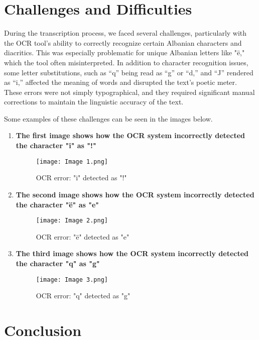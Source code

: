 \documentclass[12pt]{article}
\begin{document}
\section*{Challenges and Difficulties}
During the transcription process, we faced several challenges, particularly with the OCR tool’s ability to correctly recognize certain Albanian characters and diacritics. This was especially problematic for unique Albanian letters like "ë," which the tool often misinterpreted. In addition to character recognition issues, some letter substitutions, such as “q” being read as “g” or “d,” and “J” rendered as “i,” affected the meaning of words and disrupted the text’s poetic meter. These errors were not simply typographical, and they required significant manual corrections to maintain the linguistic accuracy of the text.

    \vspace{1em}
Some examples of these challenges can be seen in the images below.

\begin{enumerate}
    \item\textbf{The first image shows how the OCR system incorrectly detected the character "i" as "!"}
    \begin{figure}[h!]
        \centering
        \texttt{[image: Image 1.png]}
        \caption{OCR error: "i" detected as "!"}
        \label{fig:ocr_error1}
    \end{figure}

    \item\textbf{The second image shows how the OCR system incorrectly detected the character "ë" as "e"}
    \begin{figure}[h!]
        \centering
        \texttt{[image: Image 2.png]}
        \caption{OCR error: "ë" detected as "e"}
        \label{fig:ocr_error2}
    \end{figure}

    \item\textbf{The third image shows how the OCR system incorrectly detected the character "q" as "g"}
    \begin{figure}[h!]
        \centering
        \texttt{[image: Image 3.png]}
        \caption{OCR error: "q" detected as "g"}
        \label{fig:ocr_error3}
    \end{figure}
\end{enumerate}

\section*{Conclusion}
\end{document}
